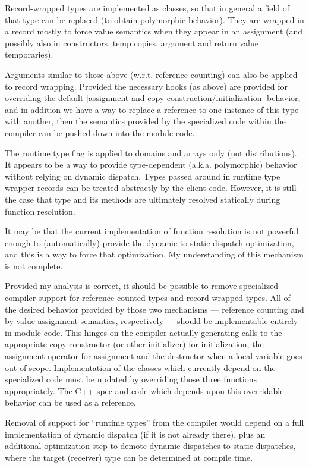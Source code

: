 Record-wrapped types are implemented as classes, so that in general a field of
that type can be replaced (to obtain polymorphic behavior).  They are wrapped in
a record mostly to force value semantics when they appear in an assignment (and
possibly also in constructors, temp copies, argument and return value
temporaries).  

Arguments similar to those above (w.r.t. reference counting) can also be applied
to record wrapping.  Provided the necessary hooks (as above) are provided for
overriding the default [assignment and copy construction/initialization]
behavior, and in addition we have a way to replace a reference to one instance
of this type with another, then the semantics provided by the specialized code
within the compiler can be pushed down into the module code.

The runtime type flag is applied to domains and arrays only (not
distributions).  It appears to be a way to provide type-dependent
(a.k.a. polymorphic) behavior without relying on dynamic dispatch.  Types passed
around in runtime type wrapper records can be treated abstractly by the client
code.  However, it is still the case that type and its methods are ultimately
resolved statically during function resolution.  

It may be that the current
implementation of function resolution is not powerful enough to (automatically)
provide the dynamic-to-static dispatch optimization, and this is a way to force
that optimization.  My understanding of this mechanism is not complete.

\vskip 0.5in

Provided my analysis is correct, it should be possible to remove specialized
compiler support for reference-counted types and record-wrapped types.  All of
the desired behavior provided by those two mechanisms --- reference
counting and by-value assignment semantics, respectively --- should be
implementable entirely in module code.  This hinges on the compiler actually
generating calls to the appropriate copy constructor (or other initializer) for
initialization, the assignment operator for assignment and the destructor when a
local variable goes out of scope.  Implementation of the classes which currently
depend on the specialized code must be updated by overriding those three
functions appropriately.  The C++ spec and code which depends upon this
overridable behavior can be used as a reference.

Removal of support for ``runtime types'' from the compiler would depend on a
full implementation of dynamic dispatch (if it is not already there), plus an
additional optimization step to demote dynamic dispatches to static dispatches,
where the target (receiver) type can be determined at compile time.

